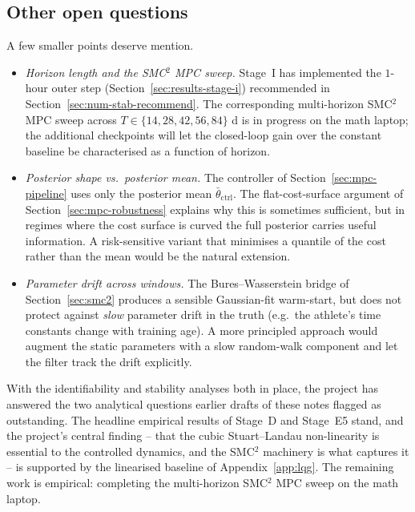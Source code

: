 \subsection{Other open questions}\label{sec:discussion-other}

A few smaller points deserve mention.

\begin{itemize}
  \item \emph{Horizon length and the SMC${}^2$ MPC sweep.} Stage~I has
        implemented the $1$-hour outer step
        (Section~\ref{sec:results-stage-i}) recommended in
        Section~\ref{sec:num-stab-recommend}. The corresponding
        multi-horizon SMC${}^2$ MPC sweep across
        $T \in \{14,28,42,56,84\}$ d is in progress on the math
        laptop; the additional checkpoints will let the closed-loop
        gain over the constant baseline be characterised as a
        function of horizon.
  \item \emph{Posterior shape vs.\ posterior mean.} The controller of
        Section~\ref{sec:mpc-pipeline} uses only the posterior mean
        $\bar\theta_{\mathrm{ctrl}}$. The flat-cost-surface argument of
        Section~\ref{sec:mpc-robustness} explains why this is sometimes
        sufficient, but in regimes where the cost surface is curved the
        full posterior carries useful information. A risk-sensitive
        variant that minimises a quantile of the cost rather than the
        mean would be the natural extension.
  \item \emph{Parameter drift across windows.} The Bures--Wasserstein
        bridge of Section~\ref{sec:smc2} produces a sensible
        Gaussian-fit warm-start, but does not protect against
        \emph{slow} parameter drift in the truth (e.g.\ the athlete's
        time constants change with training age). A more principled
        approach would augment the static parameters with a slow
        random-walk component and let the filter track the drift
        explicitly.
\end{itemize}

\medskip
\noindent
With the identifiability and stability analyses both in place, the
project has answered the two analytical questions earlier drafts of
these notes flagged as outstanding. The headline empirical results
of Stage~D and Stage~E5 stand, and the project's central finding --
that the cubic Stuart--Landau non-linearity is essential to the
controlled dynamics, and the SMC${}^2$ machinery is what captures it
-- is supported by the linearised baseline of Appendix~\ref{app:lqg}.
The remaining work is empirical: completing the multi-horizon
SMC${}^2$ MPC sweep on the math laptop.
